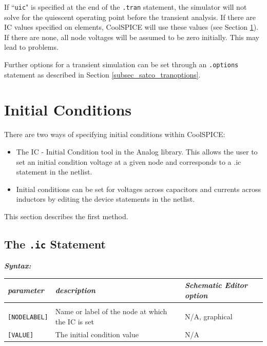 If ``\texttt{uic}" is specified at the end of the \texttt{.tran} statement, the simulator will not solve for the quiescent operating point before the transient analysis. If there are IC values specified on elements, CoolSPICE will use these values (see Section \ref{sec_satco_initialconditions}).  If there are none, all node voltages will be assumed to be zero initially.  This may lead to problems.

Further options for a transient simulation can be set through an \texttt{.options} statement as described in Section \ref{subsec_satco_tranoptions}.

\section{Initial Conditions}
\label{sec_satco_initialconditions}

There are two ways of specifying initial conditions within CoolSPICE:

\begin{itemize}
\item  The \textsf{IC - Initial Condition} tool in the \textsf{Analog} library.  This allows the user to set an initial condition voltage at a given node and corresponds to a \textsf{.ic} statement in the netlist.  
\item Initial conditions can be set for voltages across capacitors and currents across inductors by editing the device statements in the netlist.  
\end{itemize}

This section describes the first method.

\subsection{The \texttt{.ic} Statement}
\label{sec_satco_icstatement}

\textbf{\textit{Syntax:}}


\begin{tabular}{lp{5.5cm}p{5cm}}
\textit{parameter} & \textit{description} & \textit{Schematic Editor option}\\ \hline \\ \vspace{-0.8\parskip}
\texttt{[NODELABEL]} & Name or label of the node at which the IC is set & \textsf{N/A, graphical} \\
\texttt{[VALUE]} & The initial condition value & \textsf{N/A} 
\end{tabular}

